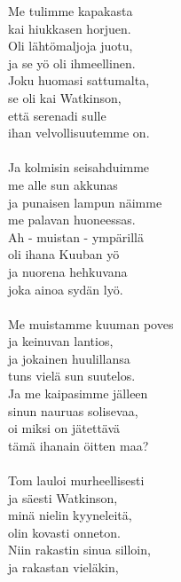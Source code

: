 
        Me tulimme kapakasta \\
        kai hiukkasen horjuen. \\
        Oli lähtömaljoja juotu, \\
        ja se yö oli ihmeellinen. \\
        Joku huomasi sattumalta, \\
        se oli kai Watkinson, \\
        että serenadi sulle \\
        ihan velvollisuutemme on. \\
\hspace{10mm} \\
        Ja kolmisin seisahduimme \\
        me alle sun akkunas \\
        ja punaisen lampun näimme \\
        me palavan huoneessas. \\
        Ah - muistan - ympärillä \\
        oli ihana Kuuban yö \\
        ja nuorena hehkuvana \\
        joka ainoa sydän lyö. \\
\hspace{10mm} \\
        Me muistamme kuuman poves \\
        ja keinuvan lantios, \\
        ja jokainen huulillansa \\
        tuns vielä sun suutelos. \\
        Ja me kaipasimme jälleen \\
        sinun nauruas solisevaa, \\
        oi miksi on jätettävä \\
        tämä ihanain öitten maa? \\
\hspace{10mm} \\
        Tom lauloi murheellisesti \\
        ja säesti Watkinson, \\
        minä nielin kyyneleitä, \\
        olin kovasti onneton. \\
        Niin rakastin sinua silloin, \\
        ja rakastan vieläkin, \\
